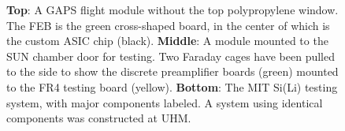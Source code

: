 \documentclass[journal]{IEEEtran}
\begin{document}

 





%
%

\begin{figure}[h]
\centering


\vspace{0.3cm}


\vspace{0.3mm}


\caption{\textbf{Top}: A GAPS flight module without the top polypropylene window. The FEB is the green cross-shaped board, in the center of which is the custom ASIC chip (black). \textbf{Middle}: A module mounted to the SUN chamber door for testing. Two Faraday cages have been pulled to the side to show the discrete preamplifier boards (green) mounted to the FR4 testing board (yellow). \textbf{Bottom}: The MIT Si(Li) testing system, with major components labeled. A system using identical components was constructed at UHM.}
\label{figure:module}
\end{figure}
\end{document}
